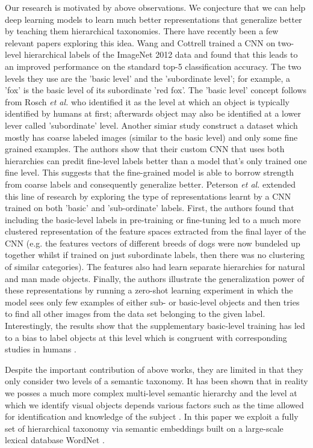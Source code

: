 \documentclass[12pt]{report}
\begin{document}
Our research is motivated by above observations. We conjecture that we can help deep learning models to learn much better representations that generalize better by teaching them hierarchical taxonomies. There have recently been a few relevant papers exploring this idea. Wang and Cottrell \cite{Wang2015} trained a CNN on two-level hierarchical labels of the ImageNet 2012 data \cite{Russakovsky2015} and found that this leads to an improved performance on the standard top-5 classification accuracy. The two levels they use are the 'basic level' and the 'subordinate level'; for example, a 'fox' is the basic level of its subordinate 'red fox'. The 'basic level' concept follows from Rosch \textit{et al.} \cite{Rosch1976} who identified it as the level at which an object is typically identified by humans at first; afterwards object may also be identified at a lower lever called 'subordinate' level. Another simiar study \cite{Lei2018} construct a dataset which mostly has coarse labeled images (similar to the basic level) and only some fine grained examples. The authors show that their custom CNN that uses both hierarchies can predit fine-level labels better than a model that's only trained one fine level. This suggests that the fine-grained model is able to borrow strength from coarse labels and consequently generalize better. Peterson \textit{et al.} extended this line of research by exploring the type of representations learnt by a CNN trained on both 'basic' and 'sub-ordinate' labels. First, the authors found that including the basic-level labels in pre-training or fine-tuning led to a much more clustered representation of the feature spaces extracted from the final layer of the CNN (e.g. the features vectors of different breeds of dogs were now bundeled up together whilst if trained on just subordinate labels, then there was no clustering of similar categories). The features also had learn separate hierarchies for natural and man made objects. Finally, the authors illustrate the generalization power of these representations by running a zero-shot learning experiment in which the model sees only few examples of either sub- or basic-level objects and then tries to find all other images from the data set belonging to the given label. Interestingly, the results show that the supplementary basic-level training has led to a bias to label objects at this level which is congruent with corresponding studies in humans \cite{Xu2000}.

Despite the important contribution of above works, they are limited in that they only consider two levels of a semantic taxonomy. It has been shown that in reality we posses a much more complex multi-level semantic hierarchy and the level at which we identify visual objects depends various factors such as the time allowed for identification and knowledge of the subject \cite{Joliceur1984}. In this paper we exploit a fully set of hierarchical taxonomy via semantic embeddings built on a large-scale lexical database WordNet \cite{Princeton2010}.
\end{document}
